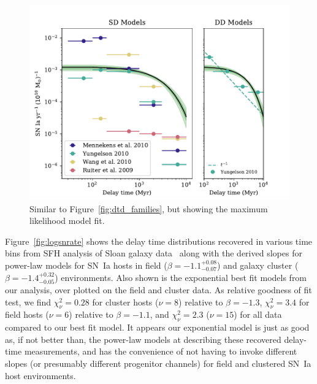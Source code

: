 \documentclass[apj]{aastex62}
\begin{document}
\begin{figure}[t]
   \centering
   \includegraphics[width=6.5in]{figure_pwr_law}
   \caption{\footnotesize Similar to Figure~\ref{fig:dtd_families}, but showing the maximum likelihood model fit.}
   \label{fig:dtd_eval}
\end{figure}

Figure~\ref{fig:logsnrate} shows the delay time distributions recovered in various time bins from SFH analysis of Sloan galaxy data~\citep{Maoz:2010a, Maoz:2011, Maoz:2012a,Graur:2013} along with the derived slopes for power-law models for SN~Ia hosts in field ($\beta=-1.1^{+0.08}_{-0.07}$) and galaxy cluster ($\beta=-1.4^{+0.32}_{-0.05}$) environments. Also shown is the exponential best fit models from our analysis, over plotted on the field and cluster data. As relative goodness of fit test, we find  $\chi^2_{\nu}=0.28$ for cluster hosts ($\nu=8$) relative to $\beta=-1.3$, $\chi^2_{\nu}=3.4$ for field hosts ($\nu=6$) relative to $\beta=-1.1$, and $\chi^2_{\nu}=2.3$ ($\nu=15$) for all data compared to our best fit model. It appears our exponential model is just as good as, if not better than, the power-law models at describing these recovered delay-time measurements, and has the convenience of not having to invoke different slopes (or presumably different progenitor channels) for field and clustered SN~Ia host environments.
\end{document}
